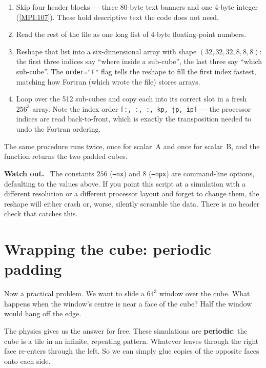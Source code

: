 \documentclass[11pt,a4paper]{report}
\newcommand{\srcbase}{vscode://file/Users/syellapa/Documents/Research/2026/ANSYS/Multi-ScalarPDF}
\newcommand{\srctag}[1]{{\footnotesize\textcolor{TagGray}{[#1]}}}
\newcommand{\MpiL}[1]{\href{\srcbase/EnsightPDFHybridDatasetMPI.py:#1}{\srctag{MPI:#1}}}
\newcommand{\code}[1]{\texttt{#1}}
\newcommand{\term}[1]{\textbf{#1}}
\renewcommand{\_}{\origtextunderscore\allowbreak}
\newlength{\calloutwidth}
\newcommand{\calloutOpen}{%
  \par\medskip\noindent
  \setlength{\calloutwidth}{\dimexpr\linewidth-2\fboxsep\relax}%
  \begin{lrbox}{\calloutbox}\begin{minipage}{\calloutwidth}}
\newcommand{\calloutClose}[1]{%
  \end{minipage}\end{lrbox}\colorbox{#1}{\usebox{\calloutbox}}\par\medskip}
\newenvironment{caution}
  {\calloutOpen\textbf{Watch out.}\ }
  {\calloutClose{WarnBG}}
\begin{document}
\begin{enumerate}
  \item Skip four header blocks --- three 80-byte text banners and one 4-byte integer
        (\MpiL{107}). These hold descriptive text the code does not need.
  \item Read the rest of the file as one long list of 4-byte floating-point numbers.
  \item Reshape that list into a six-dimensional array with shape
        $(32, 32, 32, 8, 8, 8)$: the first three indices say ``where inside a sub-cube'',
        the last three say ``which sub-cube''. The \code{order="F"} flag tells the reshape
        to fill the first index fastest, matching how Fortran (which wrote the file) stores
        arrays.
  \item Loop over the 512 sub-cubes and copy each into its correct slot in a fresh
        $256^3$ array. Note the index order \code{[:, :, :, kp, jp, ip]} --- the processor
        indices are read back-to-front, which is exactly the transposition needed to undo
        the Fortran ordering.
\end{enumerate}

The same procedure runs twice, once for scalar~A and once for scalar~B, and the function
returns the two padded cubes.

\begin{caution}
The constants $256$ (\code{--nx}) and $8$ (\code{--npx}) are command-line options, defaulting
to the values above. If you point this script at a simulation with a different resolution or
a different processor layout and forget to change them, the reshape will either crash or,
worse, silently scramble the data. There is no header check that catches this.
\end{caution}

\section{Wrapping the cube: periodic padding}
\label{sec:padding}

Now a practical problem. We want to slide a $64^3$ window over the cube. What happens when
the window's centre is near a face of the cube? Half the window would hang off the edge.

The physics gives us the answer for free. These simulations are \term{periodic}: the cube is
a tile in an infinite, repeating pattern. Whatever leaves through the right face re-enters
through the left. So we can simply glue copies of the opposite faces onto each side.
\end{document}
